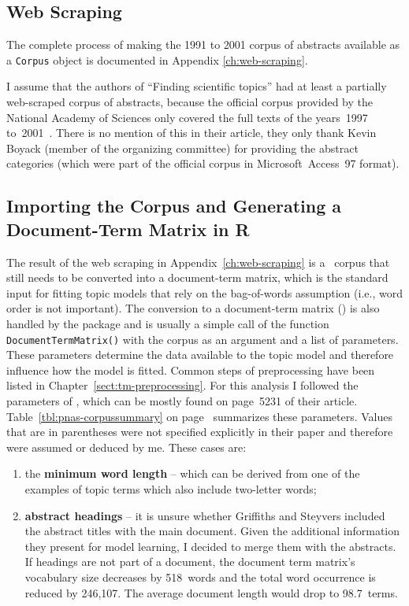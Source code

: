 \subsection{Web Scraping}

The complete process of making the 1991 to 2001 corpus of  abstracts available as a  \texttt{Corpus} object is documented in Appendix \ref{ch:web-scraping}.

I assume that the authors of ``Finding scientific topics'' had at least a partially web-scraped corpus of abstracts, because the official corpus provided by the National Academy of Sciences only covered the full texts of the years~1997 to~2001~\citep{Shiffrin2004}. There is no mention of this in their article, they only thank Kevin Boyack (member of the organizing committee) for providing the abstract categories (which were part of the official corpus in Microsoft~Access~97 format).



\subsection{Importing the Corpus and Generating a Document-Term Matrix in \textsf{R}}

The result of the web scraping in Appendix~\ref{ch:web-scraping} is a ~corpus that still needs to be converted into a document-term matrix, which is the standard input for fitting topic models that rely on the bag-of-words assumption (i.e., word order is not important). 
The conversion to a document-term matrix () is also handled by the  package and is usually a simple call of the function \texttt{DocumentTermMatrix()} with the corpus as an argument and a list of parameters. These parameters determine the data available to the topic model and therefore influence how the model is fitted. Common steps of preprocessing have been listed in Chapter~\ref{sect:tm-preprocessing}.
For this analysis I followed the parameters of , which can be mostly found on page~5231 of their article. Table~\ref{tbl:pnas-corpussummary} on page~\pageref{tbl:pnas-corpussummary} summarizes these parameters. Values that are in parentheses were not specified explicitly in their paper and therefore were assumed or deduced by me. These cases are: 
\begin{enumerate}
\item the \textbf{minimum word length} -- which can be derived from one of the examples of topic terms which also include two-letter words;
\item \textbf{abstract headings} -- it is unsure whether Griffiths and Steyvers included the abstract titles with the main document. Given the additional information they present for model learning, I decided to merge them with the abstracts. If headings are not part of a document, the document term matrix's vocabulary size decreases by 518~words and the total word occurrence is reduced by 246,107. The average document length would drop to 98.7~terms.
\end{enumerate}

